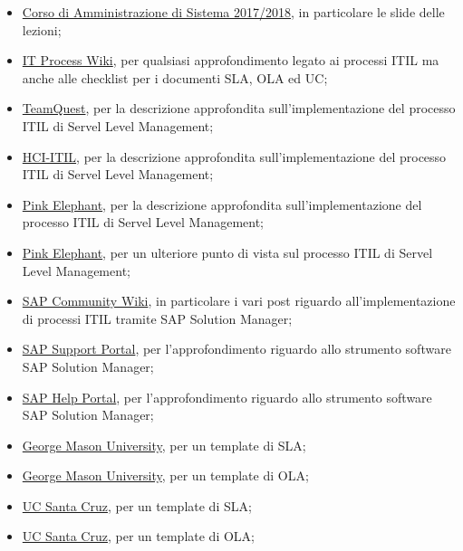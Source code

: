 \begin{itemize}
	\item \href{http://www.netadm.it/admsys_2018/admsys.htm}{Corso di Amministrazione di Sistema 2017/2018}, in particolare le slide delle lezioni;
    \item \href{https://wiki.en.it-processmaps.com/index.php/Main_Page}{IT Process Wiki}, per qualsiasi approfondimento legato ai processi ITIL ma anche alle checklist per i documenti SLA, OLA ed UC;
    \item \href{https://www.teamquest.com/files/6614/2049/9759/itil4.pdf}{TeamQuest}, per la descrizione approfondita sull'implementazione del processo ITIL di Servel Level Management;
    \item \href{https://www.hci-itil.com/ITIL_v3/docs/3792_itil_ebook_1.pdf}{HCI-ITIL}, per la descrizione approfondita sull'implementazione del processo ITIL di Servel Level Management;
    \item \href{https://www.theitsmhub.com.au/wp-content/uploads/2014/12/A-Practical-Approach-to-Implementing-Service-Level-Management.pdf}{Pink Elephant}, per la descrizione approfondita sull'implementazione del processo ITIL di Servel Level Management;
        \item \href{https://www.pinkelephant.com/uploadedFiles/Content/ResourceCenter/PinkPapers/ImplementingServiceLevelManagement.pdf}{Pink Elephant}, per un ulteriore punto di vista sul processo ITIL di Servel Level Management;
    \item \href{https://wiki.scn.sap.com/wiki/display/SAPITSM}{SAP Community Wiki}, in particolare i vari post riguardo all'implementazione di processi ITIL tramite SAP Solution Manager;
    \item \href{https://support.sap.com/en/index.html}{SAP Support Portal}, per l'approfondimento riguardo allo strumento software SAP Solution Manager;
    \item \href{https://help.sap.com/viewer/index}{SAP Help Portal}, per l'approfondimento riguardo allo strumento software SAP Solution Manager;
    \item \href{https://tsd.gmu.edu/policies/SLAs/}{George Mason University}, per un template di SLA;
    \item \href{https://tsd.gmu.edu/policies/olas.cfm}{George Mason University}, per un template di OLA;
    \item \href{https://its.ucsc.edu/itsm/servicemgmt.html#definition}{UC Santa Cruz}, per un template di SLA;
    \item \href{https://its.ucsc.edu/itsm/servicemgmt.html#definition}{UC Santa Cruz}, per un template di OLA;

\end{itemize}
